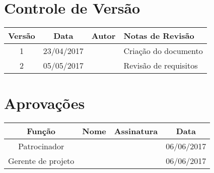 \section{Controle de Versão}

\begin{table}[H]
	\begin{tabularx}{\textwidth}{| c | c | X | X |}
		\hline
		\textbf{Versão} & \textbf{Data} & \textbf{Autor}        & \textbf{Notas de Revisão} \\
		\hline
		1                & 23/04/2017    & \projectManagerName{} & Criação do documento     \\
		\hline
		2                & 05/05/2017    & \projectManagerName{} & Revisão de requisitos     \\
		\hline
	\end{tabularx}
	\centering
\end{table}

\section{Aprovações}

\begin{table}[H]
	\begin{tabularx}{\textwidth}{| c | c | X | c |}
		\hline
		\textbf{Função}  & \textbf{Nome}         & \textbf{Assinatura}        & \textbf{Data} \\
		\hline
		Patrocinador       & \projectSponsorName{} & \projectSponsorSignature{} & 06/06/2017    \\
		\hline
		Gerente de projeto & \projectManagerName{} & \projectManagerSignature{} & 06/06/2017    \\
		\hline
	\end{tabularx}
	\centering
\end{table}